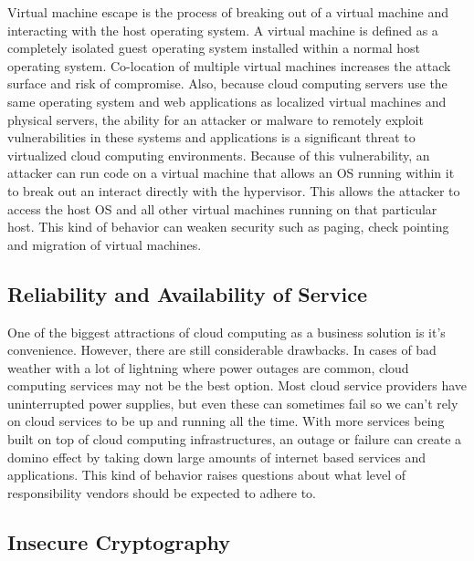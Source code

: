 \documentclass[a4paper, 8pt]{article} %
\begin{document}
\begin{doublespacing}
Virtual machine escape is the process of breaking out of a virtual machine and interacting with the host operating system.  A virtual machine is defined as a completely isolated guest operating system installed within a normal host operating system.  Co-location of multiple virtual machines increases the attack surface and risk of compromise.  Also, because cloud computing servers use the same operating system and web applications as localized virtual machines and physical servers, the ability for an attacker or malware to remotely exploit vulnerabilities in these systems and applications is a significant threat to virtualized cloud computing environments.  Because of this vulnerability, an attacker can run code on a virtual machine that allows an OS running within it to break out an interact directly with the hypervisor.  This allows the attacker to access the host OS and all other virtual machines running on that particular host.  This kind of behavior can weaken security such as paging, check pointing and migration of virtual machines.  

\subsection*{Reliability and Availability of Service}

One of the biggest attractions of cloud computing as a business solution is it's convenience.  However, there are still considerable drawbacks.  In cases of bad weather with a lot of lightning where power outages are common, cloud computing services may not be the best option.  Most cloud service providers have uninterrupted power supplies, but even these can sometimes fail so we can't rely on cloud services to be up and running all the time.  With more services being built on top of cloud computing infrastructures, an outage or failure can create a domino effect by taking down large amounts of internet based services and applications.  This kind of behavior raises questions about what level of responsibility vendors should be expected to adhere to.  

\subsection*{Insecure Cryptography}


\end{doublespacing}
\end{document}
